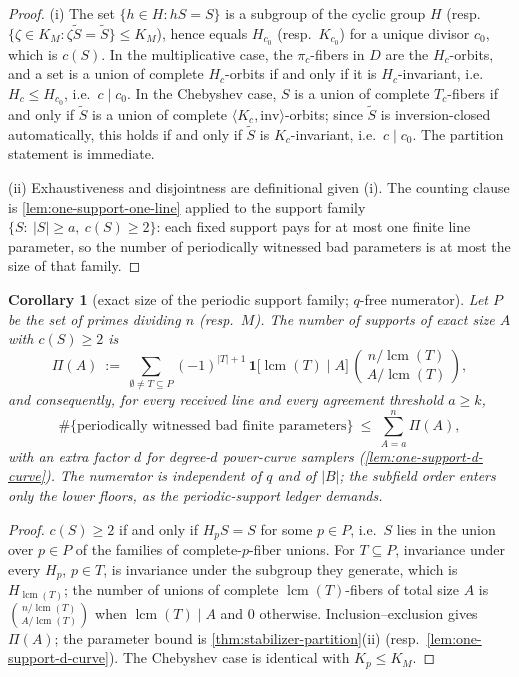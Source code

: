 \documentclass[11pt]{article}
\newtheorem{corollary}[theorem]{Corollary}
\theoremstyle{definition}
\theoremstyle{remark}
\newcommand{\B}{B}
\begin{document}
\begin{proof}
(i) The set $\{h\in H:hS=S\}$ is a subgroup of the cyclic group $H$ (resp.\ $\{\zeta\in K_M:\zeta\widetilde S=\widetilde S\}\le K_M$), hence equals $H_{c_0}$ (resp.\ $K_{c_0}$) for a unique divisor $c_0$, which is $c(S)$. In the multiplicative case, the $\pi_c$-fibers in $D$ are the $H_c$-orbits, and a set is a union of complete $H_c$-orbits if and only if it is $H_c$-invariant, i.e.\ $H_c\le H_{c_0}$, i.e.\ $c\mid c_0$. In the Chebyshev case, $S$ is a union of complete $T_c$-fibers if and only if $\widetilde S$ is a union of complete $\langle K_c,\mathrm{inv}\rangle$-orbits; since $\widetilde S$ is inversion-closed automatically, this holds if and only if $\widetilde S$ is $K_c$-invariant, i.e.\ $c\mid c_0$. The partition statement is immediate.

(ii) Exhaustiveness and disjointness are definitional given (i). The counting clause is \cref{lem:one-support-one-line} applied to the support family $\{S:\ |S|\ge a,\ c(S)\ge2\}$: each fixed support pays for at most one finite line parameter, so the number of periodically witnessed bad parameters is at most the size of that family.
\end{proof}

\begin{corollary}[exact size of the periodic support family; $q$-free numerator]\label{cor:periodic-support-count}
Let $P$ be the set of primes dividing $n$ \textup(resp.\ $M$\textup). The number of supports of exact size $A$ with $c(S)\ge2$ is
\[
\Pi(A)\ :=\ \sum_{\emptyset\ne T\subseteq P}(-1)^{|T|+1}\,
\mathbf 1\bigl[\operatorname{lcm}(T)\mid A\bigr]\,
\binom{\,n/\operatorname{lcm}(T)\,}{\,A/\operatorname{lcm}(T)\,},
\]
and consequently, for every received line and every agreement threshold $a\ge k$,
\[
\#\{\text{periodically witnessed bad finite parameters}\}\ \le\ \sum_{A=a}^{n}\Pi(A),
\]
with an extra factor $d$ for degree-$d$ power-curve samplers \textup(\cref{lem:one-support-d-curve}\textup). The numerator is independent of $q$ and of $|\B|$; the subfield order enters only the lower floors, as the periodic-support ledger demands.
\end{corollary}

\begin{proof}
$c(S)\ge2$ if and only if $H_pS=S$ for some $p\in P$, i.e.\ $S$ lies in the union over $p\in P$ of the families of complete-$p$-fiber unions. For $T\subseteq P$, invariance under every $H_p$, $p\in T$, is invariance under the subgroup they generate, which is $H_{\operatorname{lcm}(T)}$; the number of unions of complete $\operatorname{lcm}(T)$-fibers of total size $A$ is $\binom{n/\operatorname{lcm}(T)}{A/\operatorname{lcm}(T)}$ when $\operatorname{lcm}(T)\mid A$ and $0$ otherwise. Inclusion--exclusion gives $\Pi(A)$; the parameter bound is \cref{thm:stabilizer-partition}(ii) \textup(resp.\ \cref{lem:one-support-d-curve}\textup). The Chebyshev case is identical with $K_p\le K_M$.
\end{proof}
\end{document}

